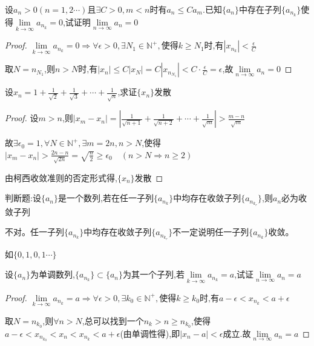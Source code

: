 \begin{exercise}
    设$a_n>0(n=1,2\cdots)$且$\exists C>0,m<n$时有$a_n\le Ca_m$.已知$\{a_n\}$中存在子列$\{a_{n_k}\}$使得$\lim \limits_{k \to \infty} a_{n_k}=0$,试证明$\lim \limits_{n \to \infty} a_n = 0$
\end{exercise}

\begin{proof}
    
    $\lim \limits_{k \to \infty} a_{n_k}=0 \Longrightarrow \forall \epsilon>0,\exists N_1 \in \mathbb{N}^+,\mbox{使得}k\ge N_1\mbox{时,有}|x_{n_k}|<\frac{\epsilon}{C}$

    取$N=n_{N_1}$,$\mbox{则}n>N\mbox{时,有}|x_n|\le C|x_{N}|=C|x_{n_{N_1}}|<C\cdot \frac{\epsilon}{C} =\epsilon$,故$\lim \limits_{n \to \infty} a_n = 0$
\end{proof}

\begin{exercise}
    设$x_n=1+\frac{1}{\sqrt{2}}+\frac{1}{\sqrt{3}}+\cdots+\frac{1}{\sqrt{n}}$,求证$\{x_n\}$发散
\end{exercise}

\begin{proof}
    
    设$m>n$,则$|x_m-x_n|=|\frac{1}{\sqrt{n+1}}+\frac{1}{\sqrt{n+2}}+\cdots+\frac{1}{\sqrt{m}}|>\frac{m-n}{\sqrt{m}}$

    故$\exists \epsilon_0 =1,\forall N\in \mathbb{N}^+,\exists m=2n,n >N$,使得$|x_{m}-x_{n}|>\frac{2n-n}{\sqrt{2n}} = \sqrt{\frac{n}{2}}\ge \epsilon_0 \quad (n>N\Longrightarrow n\ge 2)$

    由柯西收敛准则的否定形式得,$\{x_n\}$发散
\end{proof}

\begin{exercise}
    判断题:设$\{a_n\}$是一个数列,若在任一子列$\{a_{n_k}\}$中均存在收敛子列$\{a_{n_{k_r}}\}$,则$a_n$必为收敛子列
\end{exercise}

\begin{solution}
    
    不对。任一子列$\{a_{n_k}\}$中均存在收敛子列$\{a_{n_{k_r}}\}$不一定说明任一子列$\{a_{n_k}\}$收敛。

    如$\{0,1,0,1\cdots\}$
\end{solution}


\begin{exercise}
    设$\{a_n\}$为单调数列,$\{a_{n_k}\} \subset \{a_n\}$为其一个子列,若$\lim \limits_{k \to \infty} a_{n_k}=a$,试证$\lim \limits_{n \to \infty} a_n=a$
\end{exercise}

\begin{proof}
    $\lim \limits_{k \to \infty} a_{n_k}=a \Longrightarrow \forall \epsilon>0,\exists k_0 \in \mathbb{N}^+,\mbox{使得}k\ge k_0\mbox{时,有}a-\epsilon<x_{n_k}<a+\epsilon$

    取$N=n_{k_0}$,则$\forall n>N$,总可以找到一个$n_k>n\ge n_{k_0}$,使得$a-\epsilon<x_{n_{k_0}}<x_n<x_{n_k}<a+\epsilon$(由单调性得),即$|x_n-a|<\epsilon$成立.故$\lim \limits_{n \to \infty} a_n=a$
\end{proof}